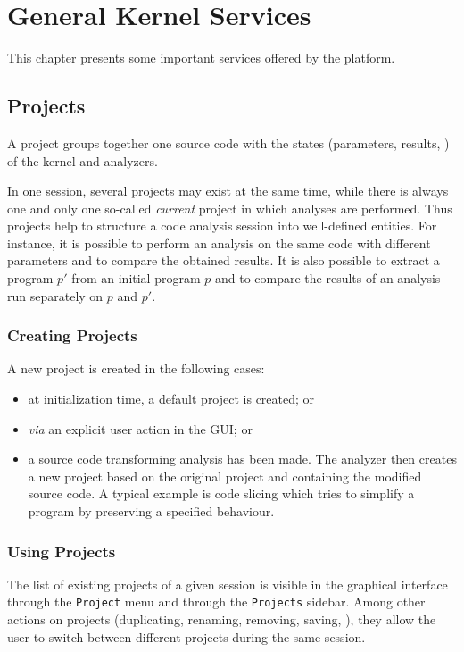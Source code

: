 \chapter{General Kernel Services}\label{user-services}

This chapter presents some important services offered by the \FramaC platform.

\section{Projects}\label{sec:project}

A \FramaC project groups together one source code with the states (parameters,
results, \etc) of the \FramaC kernel and analyzers.

In one \FramaC session, several projects may exist at the same time, while
there is always one and only one so-called \emph{current} project in which
analyses are performed.  Thus projects help to structure a code analysis
session into well-defined entities. For instance, it is possible to perform an
analysis on the same code with different parameters and to compare the obtained
results. It is also possible to extract a program $p'$ from an initial program
$p$ and to compare the results of an analysis run separately on $p$ and $p'$.

\subsection{Creating Projects}

A new project is created in the following cases:
\begin{itemize}
\item at initialization time, a default project is created; or
\item \emph{via} an explicit user action in the GUI; or
\item a source code transforming analysis has been made. The analyzer then
  creates a new project based on the original project and containing the
  modified source code. A typical example is code slicing which tries to
  simplify a program by preserving a specified behaviour.
\end{itemize}

\subsection{Using Projects}

The list of existing projects of a given session is visible in the graphical
interface through the \texttt{Project} menu and through the \texttt{Projects}
sidebar. Among other actions on projects (duplicating, renaming, removing,
saving, \etc), they allow the user to switch between different projects during
the same session.

